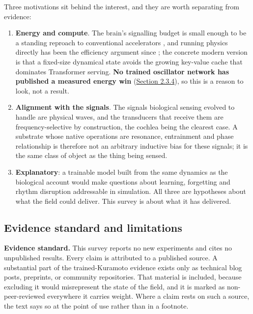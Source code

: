 \documentclass[a4paper,fleqn]{cas-sc}
\providecommand{\tightlist}{%
  \setlength{\itemsep}{0pt}\setlength{\parskip}{0pt}}
\begin{document}
Three motivations sit behind the interest, and they are worth separating
from evidence:

\begin{enumerate}
\def\labelenumi{\arabic{enumi}.}
\tightlist
\item
  \textbf{Energy and compute}. The brain's signalling budget is small
  enough to be a standing reproach to conventional accelerators
  \citep{attwell2001}, and running physics directly has been the
  efficiency argument since \citet{mead1990}; the concrete modern
  version is that a fixed-size dynamical state avoids the growing
  key-value cache that dominates Transformer serving. \textbf{No trained
  oscillator network has published a measured energy win}
  (\hyperref[sec-2-3-4]{Section 2.3.4}), so this is a reason to look,
  not a result.
\item
  \textbf{Alignment with the signals}. The signals biological sensing
  evolved to handle are physical waves, and the transducers that receive
  them are frequency-selective by construction, the cochlea being the
  clearest case. A substrate whose native operations are resonance,
  entrainment and phase relationship is therefore not an arbitrary
  inductive bias for these signals; it is the same class of object as
  the thing being sensed.
\item
  \textbf{Explanatory}: a trainable model built from the same dynamics
  as the biological account would make questions about learning,
  forgetting and rhythm disruption addressable in simulation. All three
  are hypotheses about what the field could deliver. This survey is
  about what it has delivered.
\end{enumerate}

\subsection{Evidence standard and limitations}\label{sec-1-5}

\textbf{Evidence standard.} This survey reports no new experiments and
cites no unpublished results. Every claim is attributed to a published
source. A substantial part of the trained-Kuramoto evidence exists only
as technical blog posts, preprints, or community repositories. That
material is included, because excluding it would misrepresent the state
of the field, and it is marked as non-peer-reviewed everywhere it
carries weight. Where a claim rests on such a source, the text says so
at the point of use rather than in a footnote.
\end{document}
